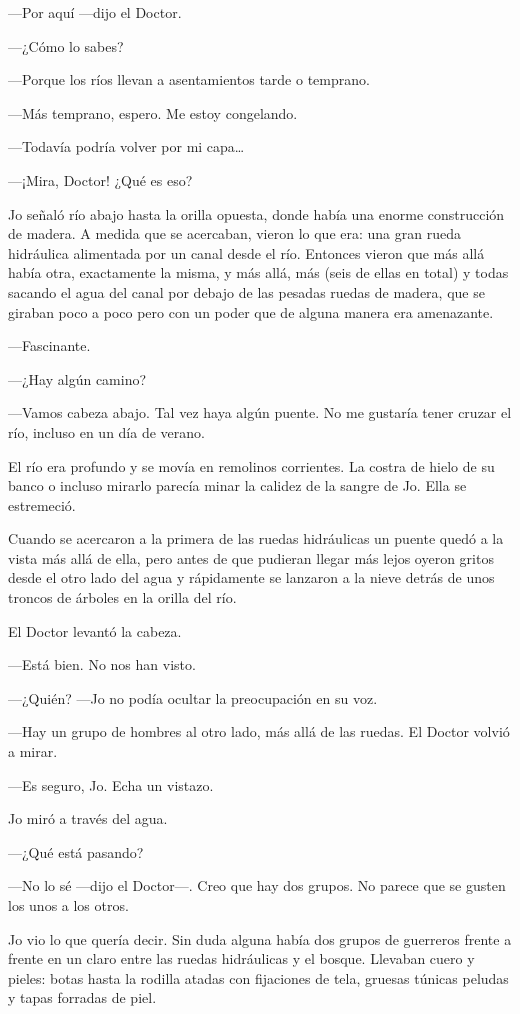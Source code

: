 ---Por aquí ---dijo el Doctor.

---¿Cómo lo sabes?

---Porque los ríos llevan a asentamientos tarde o temprano.

---Más temprano, espero. Me estoy congelando.

---Todavía podría volver por mi capa\ldots{}

---¡Mira, Doctor! ¿Qué es eso?

Jo señaló río abajo hasta la orilla opuesta, donde había una enorme
construcción de madera. A medida que se acercaban, vieron lo que era:
una gran rueda hidráulica alimentada por un canal desde el río. Entonces
vieron que más allá había otra, exactamente la misma, y más allá, más
(seis de ellas en total) y todas sacando el agua del canal por debajo de
las pesadas ruedas de madera, que se giraban poco a poco pero con un
poder que de alguna manera era amenazante.

---Fascinante.

---¿Hay algún camino?

---Vamos cabeza abajo. Tal vez haya algún puente. No me gustaría tener
cruzar el río, incluso en un día de verano.

El río era profundo y se movía en remolinos corrientes. La costra de
hielo de su banco o incluso mirarlo parecía minar la calidez de la
sangre de Jo. Ella se estremeció.

Cuando se acercaron a la primera de las ruedas hidráulicas un puente
quedó a la vista más allá de ella, pero antes de que pudieran llegar más
lejos oyeron gritos desde el otro lado del agua y rápidamente se
lanzaron a la nieve detrás de unos troncos de árboles en la orilla del
río.

El Doctor levantó la cabeza.

---Está bien. No nos han visto.

---¿Quién? ---Jo no podía ocultar la preocupación en su voz.

---Hay un grupo de hombres al otro lado, más allá de las ruedas. El
Doctor volvió a mirar.

---Es seguro, Jo. Echa un vistazo.

Jo miró a través del agua.

---¿Qué está pasando?

---No lo sé ---dijo el Doctor---. Creo que hay dos grupos. No parece que
se gusten los unos a los otros.

Jo vio lo que quería decir. Sin duda alguna había dos grupos de
guerreros frente a frente en un claro entre las ruedas hidráulicas y el
bosque. Llevaban cuero y pieles: botas hasta la rodilla atadas con
fijaciones de tela, gruesas túnicas peludas y tapas forradas de piel.

